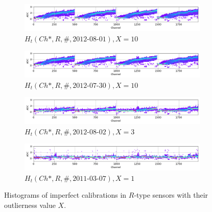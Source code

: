 \begin{figure}
    \begin{subfigure}[b]{\textwidth}
    \centering
    \includegraphics[width=0.9\linewidth]{figures/chapter4/calib_analysis/P2-all-bad-cals-R-0.png}
    \caption{$H_t(Ch*, R, \#, \text{2012-08-01}), X=10$}
    \label{plot:all-bad-r-0}
  \end{subfigure}


    \begin{subfigure}[b]{\textwidth}
    \centering
    \includegraphics[width=0.9\linewidth]{figures/chapter4/calib_analysis/P2-all-bad-cals-R-1.png}
    \caption{$H_t(Ch*, R, \#, \text{2012-07-30}), X=10$}
    \label{plot:all-bad-r-1}
  \end{subfigure}


    \begin{subfigure}[b]{\textwidth}
    \centering
    \includegraphics[width=0.9\linewidth]{figures/chapter4/calib_analysis/P2-all-bad-cals-R-2.png}
    \caption{$H_t(Ch*, R, \#, \text{2012-08-02}), X=3$}
    \label{plot:all-bad-r-2}
  \end{subfigure}


    \begin{subfigure}[b]{\textwidth}
    \centering
    \includegraphics[width=0.9\linewidth]{figures/chapter4/calib_analysis/P2-all-bad-cals-R-3.png}
    \caption{$H_t(Ch*, R, \#, \text{2011-03-07}), X=1$}
    \label{plot:all-bad-r-3}
  \end{subfigure}
    \caption{Histograms of imperfect calibrations in $R$-type sensors with their outlierness value $X$.}
    \label{plot:all-bad-r}
\end{figure}

